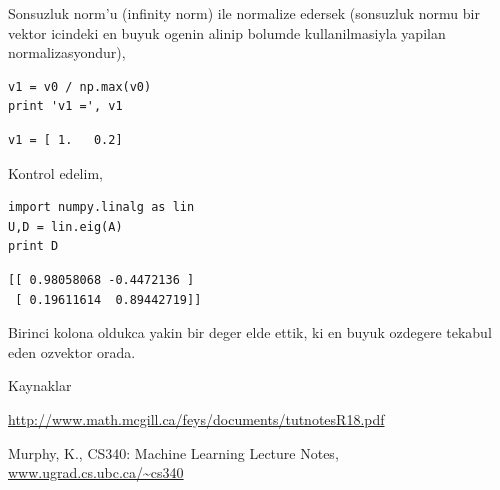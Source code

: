 \documentclass[12pt,fleqn]{article}\usepackage{../common}
\begin{document}
Sonsuzluk norm'u (infinity norm) ile normalize edersek (sonsuzluk normu bir
vektor icindeki en buyuk ogenin alinip bolumde kullanilmasiyla yapilan
normalizasyondur), 

\begin{verbatim}
v1 = v0 / np.max(v0)
print 'v1 =', v1
\end{verbatim}

\begin{verbatim}
v1 = [ 1.   0.2]
\end{verbatim}

Kontrol edelim,

\begin{verbatim}
import numpy.linalg as lin
U,D = lin.eig(A)
print D
\end{verbatim}

\begin{verbatim}
[[ 0.98058068 -0.4472136 ]
 [ 0.19611614  0.89442719]]
\end{verbatim}

Birinci kolona oldukca yakin bir deger elde ettik, ki en buyuk ozdegere
tekabul eden ozvektor orada.

Kaynaklar

\url{http://www.math.mcgill.ca/feys/documents/tutnotesR18.pdf}

Murphy, K., CS340: Machine Learning Lecture Notes, \url{www.ugrad.cs.ubc.ca/~cs340}
\end{document}
